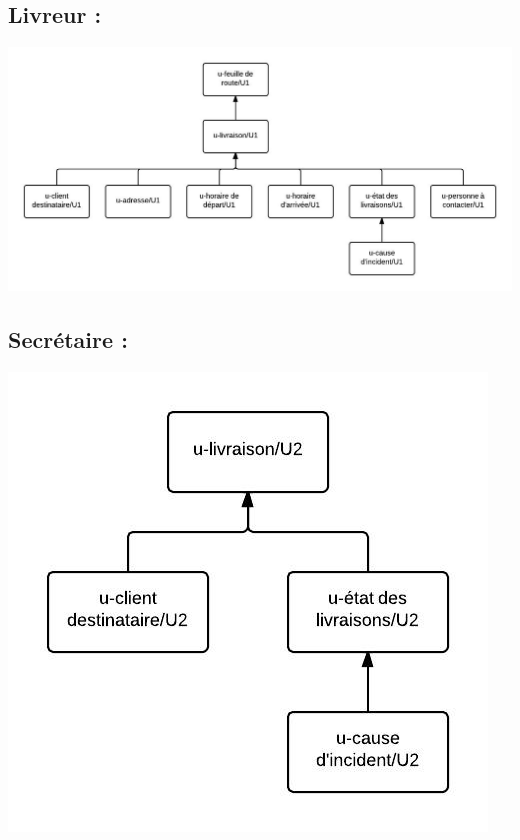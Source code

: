 \documentclass{report}
\begin{document}
\subsection{Livreur : }
\includegraphics[scale = 0.33]{images/MSIHM-U1.jpeg}

\subsection{Secrétaire : }
\includegraphics[scale = 0.4]{images/MSIHM-U2.jpeg}
\end{document}

